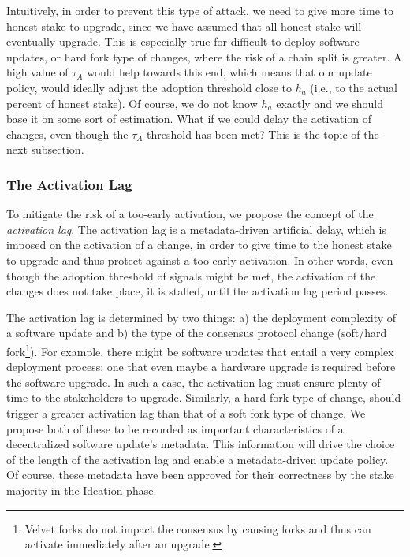 Intuitively, in order to prevent this type of attack, we need to give more time to honest stake to upgrade, since we have assumed that all honest stake will eventually upgrade. This is especially true for difficult to deploy software updates, or hard fork type of changes, where the risk of a chain split is greater. A high value of $\tau_A$ would help towards this end, which means that our update policy, would ideally adjust the adoption threshold close to $h_a$ (i.e., to the actual percent of honest stake). Of course, we do not know $h_a$ exactly and we should base it on some sort of estimation. What if we could delay the activation of changes, even though the $\tau_A$ threshold has been met? This is the topic of the next subsection. 

\subsubsection{The Activation Lag}
To mitigate the risk of a too-early activation, %
we propose the concept of the \emph{activation lag}. The activation lag is a metadata-driven artificial delay, which is imposed on the activation of a change, in order to give time to the honest stake to upgrade and thus protect against a too-early activation. In other words, even though  the adoption threshold of signals might be met, the activation of the changes does not take place, it is stalled, until the activation lag period passes.

The activation lag is determined by two things: a) the deployment complexity of a software update and b) the type of the consensus protocol change (soft/hard fork\footnote{Velvet forks \cite{velvet} do not impact the consensus by causing forks and thus can activate immediately after an upgrade.}).
For example, there might be software updates that entail a very complex deployment process; one that even maybe a hardware upgrade is required before the software upgrade. In such a case, the activation lag must ensure plenty of time to the stakeholders to upgrade. Similarly, a hard fork type of change, should trigger a greater activation lag than that of a soft fork type of change. 
We propose both of these to be recorded as important characteristics of a decentralized software update's metadata. This information will drive the choice of the length of the activation lag and enable a metadata-driven update policy. Of course, these metadata have been approved for their correctness by the stake majority in the Ideation phase.

